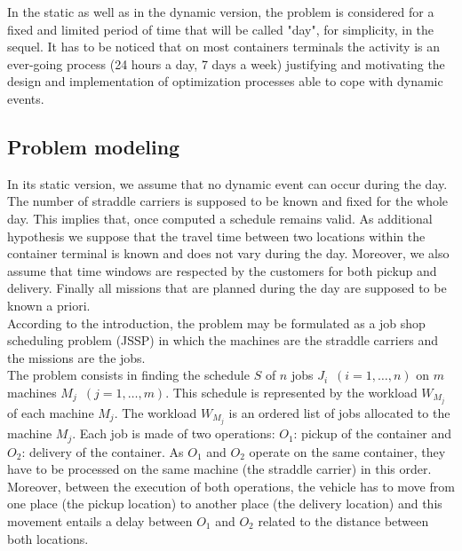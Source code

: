 \documentclass[a4paper,10pt]{article}
\begin{document}

In the static as well as in the dynamic version, the problem is considered for a fixed and limited period of time that will be called "day", for simplicity, in the sequel. It has to be noticed that on most containers terminals the activity is an ever-going process (24 hours a day, 7 days a week) justifying and motivating the design and implementation of optimization processes able to cope with dynamic events. 

\subsection{Problem modeling}

In its static version, we assume that no dynamic event can occur during the day. The number of straddle carriers is supposed to be known and fixed for the whole day. This implies that, once computed a schedule remains valid. As additional hypothesis we suppose that the travel time between two locations within the container terminal is known and does not vary during the day. Moreover, we also assume that time windows are respected by the customers for both pickup and delivery. Finally all missions that are planned during the day are supposed to be known a priori. \\


According to the introduction, the problem may be formulated as a job shop scheduling problem (JSSP) in which the machines are the straddle carriers and the missions are the jobs. \\

The problem consists in finding the schedule $S$ of $n$ jobs $J_i$~$(i=1,\ldots,n)$ on $m$ machines $M_j$~$(j=1,\ldots,m)$. This schedule is represented by the workload $W_{M_j}$ of each machine $M_j$. The workload $W_{M_j}$ is an ordered list of jobs allocated to the machine $M_j$. Each job is made of two operations: $O_1$: pickup of the container and $O_2$: delivery of the container. As $O_1$ and $O_2$ operate on the same container, they have to be processed on the same machine (the straddle carrier) in this order. Moreover, between the execution of both operations, the vehicle has to move from one place (the pickup location) to another place (the delivery location) and this movement entails a delay between $O_1$ and $O_2$ related to the distance between both locations.
\end{document}
